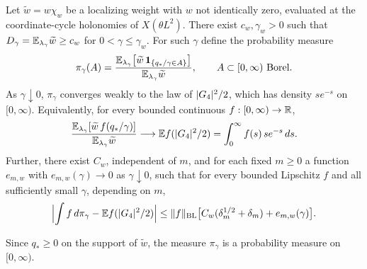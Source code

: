 \begin{theorem}\label{ch31:thm:inserted-chi-square-law}
Let $\widetilde w=w\chi_w$ be a localizing weight with $w$ not identically zero, evaluated at the coordinate-cycle holonomies of $X(\theta L^2)$. There exist $c_w,\gamma_w>0$ such that $D_\gamma=\mathbb E_{\lambda_\gamma}\widetilde w\ge c_w$ for $0<\gamma\le\gamma_w$. For such $\gamma$ define the probability measure
\[
 \pi_\gamma(A)=\frac{\mathbb E_{\lambda_\gamma}\bigl[\widetilde w\,\mathbf 1_{\{q_*/\gamma\in A\}}\bigr]}{\mathbb E_{\lambda_\gamma}\widetilde w},\qquad A\subset[0,\infty)\text{ Borel}.
\]
As $\gamma\downarrow0$, $\pi_\gamma$ converges weakly to the law of $\lvert G_4\rvert^2/2$, which has density $se^{-s}$ on $[0,\infty)$. Equivalently, for every bounded continuous $f:[0,\infty)\to\mathbb R$,
\[
 \frac{\mathbb E_{\lambda_\gamma}[\widetilde w\,f(q_*/\gamma)]}{\mathbb E_{\lambda_\gamma}\widetilde w}\longrightarrow\mathbb E f(\lvert G_4\rvert^2/2)=\int_0^\infty f(s)\,se^{-s}\,ds.
\]
Further, there exist $C_w$, independent of $m$, and for each fixed $m\ge0$ a function $e_{m,w}$ with $e_{m,w}(\gamma)\to0$ as $\gamma\downarrow0$, such that for every bounded Lipschitz $f$ and all sufficiently small $\gamma$, depending on $m$,
\[
 \Bigl\lvert\int f\,d\pi_\gamma-\mathbb E f(\lvert G_4\rvert^2/2)\Bigr\rvert\le\lVert f\rVert_{\rm BL}\bigl[C_w(\delta_m^{1/2}+\delta_m)+e_{m,w}(\gamma)\bigr].
\]
\end{theorem}

Since $q_*\ge0$ on the support of $\widetilde w$, the measure $\pi_\gamma$ is a probability measure on $[0,\infty)$.

